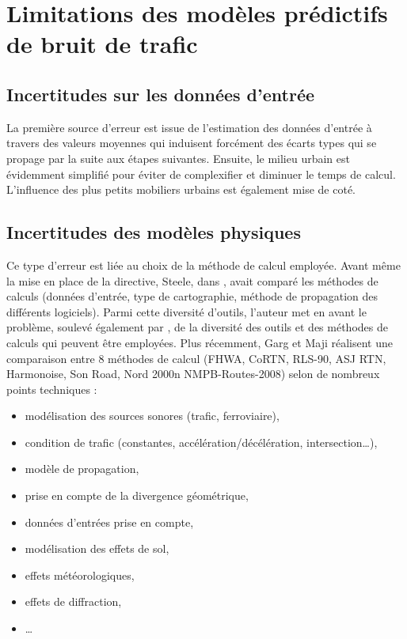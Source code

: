 \section{Limitations des modèles prédictifs de bruit de trafic}

\subsection{Incertitudes sur les données d'entrée}

La première source d'erreur est issue de l'estimation des données d'entrée à travers des valeurs moyennes qui induisent forcément des écarts types qui se propage par la suite aux étapes suivantes. 
Ensuite, le milieu urbain est évidemment simplifié pour éviter de complexifier et diminuer le temps de calcul. L'influence des plus petits mobiliers urbains est également mise de coté.
 

\subsection{Incertitudes des modèles physiques}

Ce type d'erreur est liée au choix de la méthode de calcul employée. Avant même la mise en place de la directive, Steele, dans \cite{steele_critical_2001}, avait comparé les méthodes de calculs (données d'entrée, type de cartographie, méthode de propagation des différents logiciels). Parmi cette diversité d'outils, l'auteur met en avant le problème, soulevé également par \cite{king_implementation_2011}, de la diversité des outils et des méthodes de calculs qui peuvent être employées. Plus récemment, Garg et Maji \cite{garg_critical_2014} réalisent une comparaison entre 8 méthodes de calcul (FHWA, CoRTN, RLS-90, ASJ RTN, Harmonoise, Son Road, Nord 2000n NMPB-Routes-2008) selon de nombreux points techniques : 

\begin{itemize}
\item modélisation des sources sonores (trafic, ferroviaire), 
\item condition de trafic (constantes, accélération/décélération, intersection\dots), 
\item modèle de propagation, 
\item prise en compte de la divergence géométrique, 
\item données d'entrées prise en compte, 
\item modélisation des effets de sol,
\item effets météorologiques,
\item effets de diffraction,
\item \dots  \\
\end{itemize}

